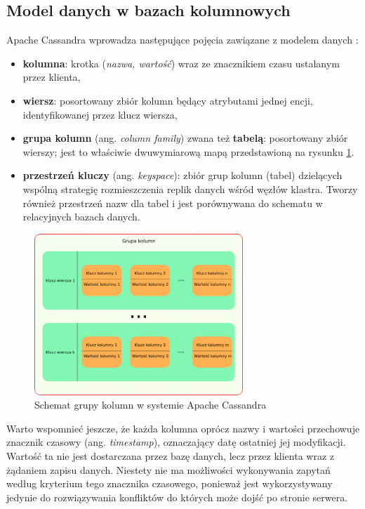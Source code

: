 \subsection{Model danych w bazach kolumnowych}

Apache Cassandra wprowadza następujące pojęcia zawiązane z modelem danych \cite{cassandraArchitecture}:
\begin{itemize}
    \item \textbf{kolumna}: krotka (\textit{nazwa, wartość}) wraz ze znacznikiem czasu ustalanym przez klienta,
    \item \textbf{wiersz}: posortowany zbiór kolumn będący atrybutami jednej encji, identyfikowanej przez klucz wiersza,
    \item \textbf{grupa kolumn} (ang. \textit{column family}) zwana też \textbf{tabelą}: posortowany zbiór wierszy; jest to właściwie dwuwymiarową mapą przedstawioną na rysunku \ref{fig:cassandraColumnFamily}.
    \item \textbf{przestrzeń kluczy} (ang. \textit{keyspace}): zbiór grup kolumn (tabel) dzielących wspólną strategię rozmieszczenia replik danych wśród węzłów klastra. Tworzy również przestrzeń nazw dla tabel i jest porównywana do schematu w relacyjnych bazach danych.
\end{itemize}

\begin{figure}[!ht]
\centering
\includegraphics[width=0.7\textwidth]{figures/casModel1.png}
\caption{Schemat grupy kolumn w systemie Apache Cassandra}
\label{fig:cassandraColumnFamily}
\end{figure}

Warto wspomnieć jeszcze, że każda kolumna oprócz nazwy i wartości przechowuje znacznik czasowy (ang. \textit{timestamp}), oznaczający datę ostatniej jej modyfikacji.
Wartość ta nie jest dostarczana przez bazę danych, lecz przez klienta wraz z żądaniem zapisu danych.
Niestety nie ma możliwości wykonywania zapytań według kryterium tego znacznika czasowego, ponieważ jest wykorzystywany jedynie do rozwiązywania konfliktów do których może dojść po stronie serwera.

